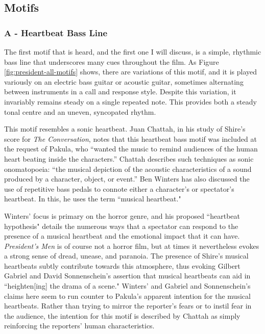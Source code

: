 \subsection{Motifs
}
\subsubsection{A - Heartbeat Bass Line}

The first motif that is heard, and the first one I will discuss, is a simple, rhythmic bass line that underscores many cues throughout the film.
As Figure \ref{fig:president-all-motifs} shows, there are variations of this motif, and it is played variously on an electric bass guitar or acoustic guitar, sometimes alternating between instruments in a call and response style.
Despite this variation, it invariably remains steady on a single repeated note.
This provides both a steady tonal centre and an uneven, syncopated rhythm.

This motif resembles a sonic heartbeat.
Juan Chattah, in his study of Shire's score for \textit{The Conversation}, notes that this heartbeat bass motif was included at the request of Pakula, who ``wanted the music to remind audiences of the human heart beating inside the characters.”\autocites[][91]{chattah_david_2015}
Chattah describes such techniques as sonic onomatopoeia: ``the musical depiction of the acoustic characteristics of a sound produced by a character, object, or event.”\autocites[][88]{chattah_david_2015}
Ben Winters has also discussed the use of repetitive bass pedals to connote either a character's or spectator's heartbeat.
In this, he uses the term ``musical heartbeat."\autocites[][]{winters_corporeality_2008}

Winters' focus is primary on the horror genre, and his proposed ``heartbeat hypothesis" details the numerous ways that a spectator can respond to the presence of a musical heartbeat and the emotional impact that it can have.
\textit{President's Men} is of course not a horror film, but at times it nevertheless evokes a strong sense of dread, unease, and paranoia.
The presence of Shire's musical heartbeats subtly contribute towards this atmosphere, thus evoking Gilbert Gabriel and David Sonnenschein's assertion that musical heartbeats can aid in ``heighten[ing] the drama of a scene."\autocites[][116]{gabriel_inner_2016}
Winters' and Gabriel and Sonnenschein's claims here seem to run counter to Pakula's apparent intention for the musical heartbeats.
Rather than trying to mirror the reporter's fears or to instil fear in the audience, the intention for this motif is described by Chattah as simply reinforcing the reporters' human characteristics.


